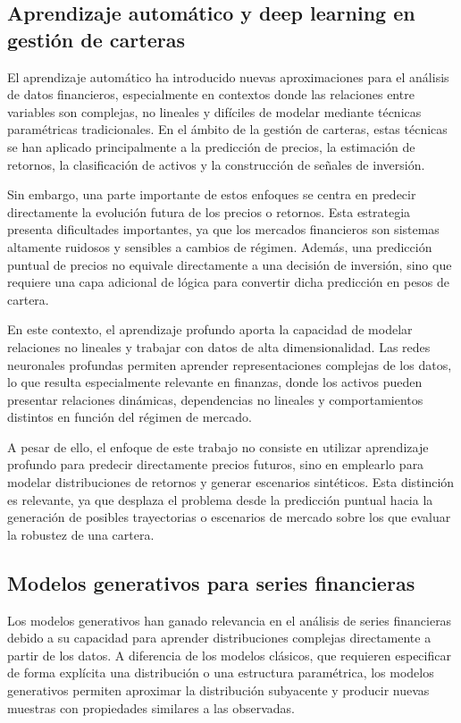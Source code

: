 \subsection{Aprendizaje automático y deep learning en gestión de carteras}

El aprendizaje automático ha introducido nuevas aproximaciones para el análisis de datos financieros, especialmente en contextos donde las relaciones entre variables son complejas, no lineales y difíciles de modelar mediante técnicas paramétricas tradicionales. En el ámbito de la gestión de carteras, estas técnicas se han aplicado principalmente a la predicción de precios, la estimación de retornos, la clasificación de activos y la construcción de señales de inversión.

Sin embargo, una parte importante de estos enfoques se centra en predecir directamente la evolución futura de los precios o retornos. Esta estrategia presenta dificultades importantes, ya que los mercados financieros son sistemas altamente ruidosos y sensibles a cambios de régimen. Además, una predicción puntual de precios no equivale directamente a una decisión de inversión, sino que requiere una capa adicional de lógica para convertir dicha predicción en pesos de cartera.

En este contexto, el aprendizaje profundo aporta la capacidad de modelar relaciones no lineales y trabajar con datos de alta dimensionalidad. Las redes neuronales profundas permiten aprender representaciones complejas de los datos, lo que resulta especialmente relevante en finanzas, donde los activos pueden presentar relaciones dinámicas, dependencias no lineales y comportamientos distintos en función del régimen de mercado.

A pesar de ello, el enfoque de este trabajo no consiste en utilizar aprendizaje profundo para predecir directamente precios futuros, sino en emplearlo para modelar distribuciones de retornos y generar escenarios sintéticos. Esta distinción es relevante, ya que desplaza el problema desde la predicción puntual hacia la generación de posibles trayectorias o escenarios de mercado sobre los que evaluar la robustez de una cartera.

\subsection{Modelos generativos para series financieras}

Los modelos generativos han ganado relevancia en el análisis de series financieras debido a su capacidad para aprender distribuciones complejas directamente a partir de los datos. A diferencia de los modelos clásicos, que requieren especificar de forma explícita una distribución o una estructura paramétrica, los modelos generativos permiten aproximar la distribución subyacente y producir nuevas muestras con propiedades similares a las observadas.

